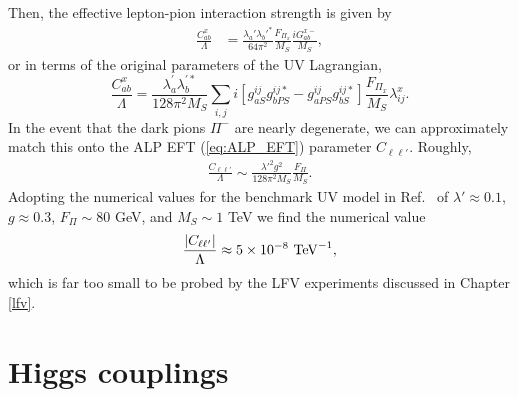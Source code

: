 Then, the effective lepton-pion interaction strength is given by
\begin{align}
    \frac{C_{ab}^x}{\Lambda} &= \frac{\lambda_a'\lambda_b'^*}{64\pi^2}\frac{F_{\Pi_x}}{M_S}\frac{iG_{ab}^{x-}}{M_S},
\end{align}
or in terms of the original parameters of the UV Lagrangian,
\begin{equation}
\frac{C_{ab}^x}{\Lambda} = \frac{\lambda_a^\prime\lambda_b^{\prime*}}{128\pi^2M_S}\sum_{i,j}i\left[g_{aS}^{ij}g_{bPS}^{ij*} - g_{aPS}^{ij}g_{bS}^{ij*}\right]\frac{F_{\Pi_x}}{M_S}\lambda_{ij}^x.
\end{equation}
In the event that the dark pions $\Pi^-$ are nearly degenerate, we can approximately match this onto the ALP EFT (\ref{eq:ALP_EFT}) parameter $C_{\ell\ell'}$. Roughly,
\begin{align}
    \frac{C_{\ell\ell'}}{\Lambda} \sim \frac{\lambda'^2 g^2}{128\pi^2 M_S}\frac{F_\Pi}{M_S}.
\end{align}
Adopting the numerical values for the benchmark UV model in Ref.~\cite{Davoudiasl:2017zws} of $\lambda' \approx 0.1$,  $g \approx 0.3$, $F_\Pi \sim 80$ GeV, and $M_S \sim 1$ TeV we find the numerical value
%
\begin{equation}
\frac{|C_{\ell \ell'}|}{\Lambda} \approx 5 \times 10^{-8}\ {\rm TeV}^{-1},
\end{equation}
which is far too small to be probed by the LFV experiments discussed in Chapter \ref{lfv}.


\section{Higgs couplings}

